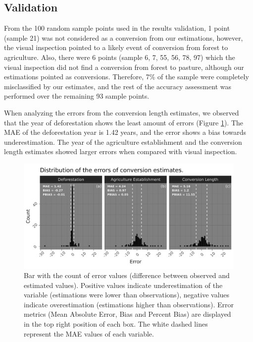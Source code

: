 \documentclass[essd, manuscript]{copernicus}
\begin{document}
\subsection{Validation}

From the 100 random sample points used in the results validation, 1 point (sample 21) was not considered as a conversion from our estimations, however, the visual inspection pointed to a likely event of conversion from forest to agriculture.
Also, there were 6 points (sample 6, 7, 55, 56, 78, 97) which the visual inspection did not find a conversion from forest to pasture, although our estimations pointed as conversions.
Therefore, 7\% of the sample were completely misclassified by our estimates, and the rest of the accuracy assessment was performed over the remaining 93 sample points.

When analyzing the errors from the conversion length estimates, we observed that the year of deforestation shows the least amount of errors (Figure \ref{fig:errorbar-plot}).
The MAE of the deforestation year is 1.42 years, and the error shows a bias towards underestimation.
The year of the agriculture establishment and the conversion length estimates showed larger errors when compared with visual inspection.

\begin{figure}[h]
\includegraphics[width=17cm]{figs/error_bars} \caption{Bar with the count of error values (difference between observed and estimated values). Positive values indicate underestimation of the variable (estimations were lower than observations), negative values indicate overestimation (estimations higher than observations). Error metrics (Mean Absolute Error, Bias and Percent Bias) are displayed in the top right position of each box. The white dashed lines represent the MAE values of each variable.}\label{fig:errorbar-plot}
\end{figure}
\end{document}
